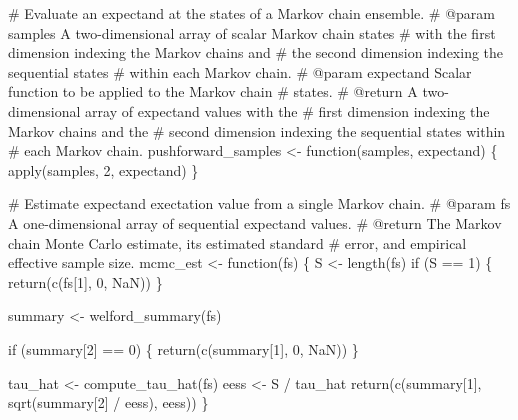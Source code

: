 \documentclass[
  letterpaper,
  DIV=11,
  numbers=noendperiod]{scrartcl}
\newenvironment{Shaded}{\begin{snugshade}}{\end{snugshade}}
\newcommand{\CommentTok}[1]{\textcolor[rgb]{0.37,0.37,0.37}{#1}}
\newcommand{\ConstantTok}[1]{\textcolor[rgb]{0.56,0.35,0.01}{#1}}
\newcommand{\ControlFlowTok}[1]{\textcolor[rgb]{0.00,0.23,0.31}{#1}}
\newcommand{\DecValTok}[1]{\textcolor[rgb]{0.68,0.00,0.00}{#1}}
\newcommand{\FunctionTok}[1]{\textcolor[rgb]{0.28,0.35,0.67}{#1}}
\newcommand{\NormalTok}[1]{\textcolor[rgb]{0.00,0.23,0.31}{#1}}
\newcommand{\OtherTok}[1]{\textcolor[rgb]{0.00,0.23,0.31}{#1}}
\newcommand{\SpecialCharTok}[1]{\textcolor[rgb]{0.37,0.37,0.37}{#1}}
\begin{document}
\begin{Shaded}
\begin{Highlighting}[]
\CommentTok{\# Evaluate an expectand at the states of a Markov chain ensemble.}
\CommentTok{\# @param samples A two{-}dimensional array of scalar Markov chain states }
\CommentTok{\#                with the first dimension indexing the Markov chains and }
\CommentTok{\#                the second dimension indexing the sequential states }
\CommentTok{\#                within each Markov chain.}
\CommentTok{\# @param expectand Scalar function to be applied to the Markov chain }
\CommentTok{\#                  states.}
\CommentTok{\# @return A two{-}dimensional array of expectand values with the }
\CommentTok{\#         first dimension indexing the Markov chains and the }
\CommentTok{\#         second dimension indexing the sequential states within }
\CommentTok{\#         each Markov chain.}
\NormalTok{pushforward\_samples }\OtherTok{\textless{}{-}} \ControlFlowTok{function}\NormalTok{(samples, expectand) \{}
  \FunctionTok{apply}\NormalTok{(samples, }\DecValTok{2}\NormalTok{, expectand)}
\NormalTok{\}}

\CommentTok{\# Estimate expectand exectation value from a single Markov chain.}
\CommentTok{\# @param fs A one{-}dimensional array of sequential expectand values.}
\CommentTok{\# @return The Markov chain Monte Carlo estimate, its estimated standard }
\CommentTok{\#         error, and empirical effective sample size.}
\NormalTok{mcmc\_est }\OtherTok{\textless{}{-}} \ControlFlowTok{function}\NormalTok{(fs) \{}
\NormalTok{  S }\OtherTok{\textless{}{-}} \FunctionTok{length}\NormalTok{(fs)}
  \ControlFlowTok{if}\NormalTok{ (S }\SpecialCharTok{==} \DecValTok{1}\NormalTok{) \{}
    \FunctionTok{return}\NormalTok{(}\FunctionTok{c}\NormalTok{(fs[}\DecValTok{1}\NormalTok{], }\DecValTok{0}\NormalTok{, }\ConstantTok{NaN}\NormalTok{))}
\NormalTok{  \}}

\NormalTok{  summary }\OtherTok{\textless{}{-}} \FunctionTok{welford\_summary}\NormalTok{(fs)}

  \ControlFlowTok{if}\NormalTok{ (summary[}\DecValTok{2}\NormalTok{] }\SpecialCharTok{==} \DecValTok{0}\NormalTok{) \{}
    \FunctionTok{return}\NormalTok{(}\FunctionTok{c}\NormalTok{(summary[}\DecValTok{1}\NormalTok{], }\DecValTok{0}\NormalTok{, }\ConstantTok{NaN}\NormalTok{))}
\NormalTok{  \}}

\NormalTok{  tau\_hat }\OtherTok{\textless{}{-}} \FunctionTok{compute\_tau\_hat}\NormalTok{(fs)}
\NormalTok{  eess }\OtherTok{\textless{}{-}}\NormalTok{ S }\SpecialCharTok{/}\NormalTok{ tau\_hat}
  \FunctionTok{return}\NormalTok{(}\FunctionTok{c}\NormalTok{(summary[}\DecValTok{1}\NormalTok{], }\FunctionTok{sqrt}\NormalTok{(summary[}\DecValTok{2}\NormalTok{] }\SpecialCharTok{/}\NormalTok{ eess), eess))}
\NormalTok{\}}


\end{Highlighting}
\end{Shaded}
\end{document}
